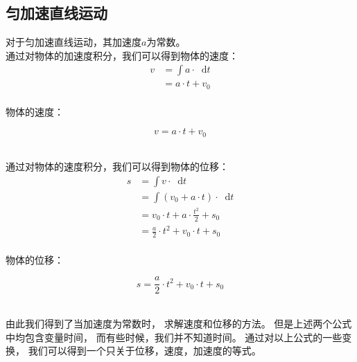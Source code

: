\documentclass[UTF8]{ctexart}
\newcommand*{\dif}{\mathop{}\!\mathrm{d}}
\begin{document}
\subsection{匀加速直线运动}
    对于匀加速直线运动，其加速度$a$为常数。\\[3mm]
    通过对物体的加速度积分，我们可以得到物体的速度：\\
    \begin{align}
        v
        &=\int a\cdot\dif t\\[2mm]
        &=a\cdot t+v_0
    \end{align}\\
    物体的速度：
    \begin{large}
        \begin{equation*}
            v=a\cdot t+v_0
        \end{equation*}
    \end{large}\\[3mm]
    通过对物体的速度积分，我们可以得到物体的位移：\\
    \begin{align}
        s
        &=\int v\cdot\dif t\\[2mm]
        &=\int (v_0+a\cdot t)\cdot\dif t\\[1mm]
        &=v_0\cdot t+a\cdot\frac{t^2}{2}+s_0\\[3mm]
        &=\frac{a}{2}\cdot t^2+v_0\cdot t+s_0
    \end{align}\\
    物体的位移：
    \begin{large}
        \begin{equation*}
            s=\frac{a}{2}\cdot t^2+v_0\cdot t+s_0
        \end{equation*}
    \end{large}\\[5mm]
    由此我们得到了当加速度为常数时，
    求解速度和位移的方法。
    但是上述两个公式中均包含变量时间，
    而有些时候，我们并不知道时间。
    通过对以上公式的一些变换，
    我们可以得到一个只关于位移，速度，加速度的等式。

\newpage
\end{document}
